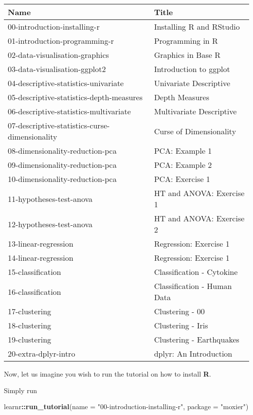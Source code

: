 \documentclass[]{book}
\newenvironment{Shaded}{\begin{snugshade}}{\end{snugshade}}
\newcommand{\KeywordTok}[1]{\textcolor[rgb]{0.13,0.29,0.53}{\textbf{#1}}}
\newcommand{\DataTypeTok}[1]{\textcolor[rgb]{0.13,0.29,0.53}{#1}}
\newcommand{\StringTok}[1]{\textcolor[rgb]{0.31,0.60,0.02}{#1}}
\newcommand{\OperatorTok}[1]{\textcolor[rgb]{0.81,0.36,0.00}{\textbf{#1}}}
\newcommand{\NormalTok}[1]{#1}
\begin{document}
\begin{tabular}{l|l}
\hline
Name & Title\\
\hline
00-introduction-installing-r & Installing R and RStudio\\
\hline
01-introduction-programming-r & Programming in R\\
\hline
02-data-visualisation-graphics & Graphics in Base R\\
\hline
03-data-visualisation-ggplot2 & Introduction to ggplot\\
\hline
04-descriptive-statistics-univariate & Univariate Descriptive\\
\hline
05-descriptive-statistics-depth-measures & Depth Measures\\
\hline
06-descriptive-statistics-multivariate & Multivariate Descriptive\\
\hline
07-descriptive-statistics-curse-dimensionality & Curse of Dimensionality\\
\hline
08-dimensionality-reduction-pca & PCA: Example 1\\
\hline
09-dimensionality-reduction-pca & PCA: Example 2\\
\hline
10-dimensionality-reduction-pca & PCA: Exercise 1\\
\hline
11-hypotheses-test-anova & HT and ANOVA: Exercise 1\\
\hline
12-hypotheses-test-anova & HT and ANOVA: Exercise 2\\
\hline
13-linear-regression & Regression: Exercise 1\\
\hline
14-linear-regression & Regression: Exercise 1\\
\hline
15-classification & Classification - Cytokine\\
\hline
16-classification & Classification - Human Data\\
\hline
17-clustering & Clustering - 00\\
\hline
18-clustering & Clustering - Iris\\
\hline
19-clustering & Clustering - Earthquakes\\
\hline
20-extra-dplyr-intro & dplyr: An Introduction\\
\hline
\end{tabular}

Now, let us imagine you wish to run the tutorial on how to install
\textbf{R}.

Simply run

\begin{Shaded}
\begin{Highlighting}[]
\NormalTok{learnr}\OperatorTok{::}\KeywordTok{run_tutorial}\NormalTok{(}\DataTypeTok{name =} \StringTok{"00-introduction-installing-r"}\NormalTok{, }\DataTypeTok{package =} \StringTok{"moxier"}\NormalTok{)}
\end{Highlighting}
\end{Shaded}
\end{document}
